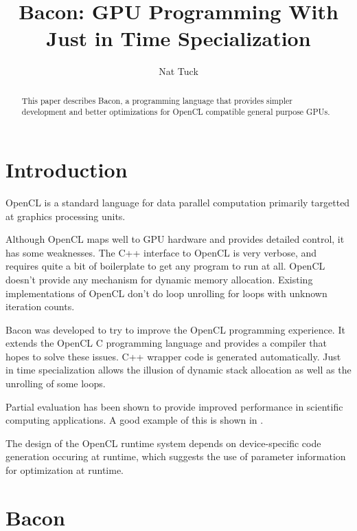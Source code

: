 \documentclass{llncs}
\begin{document}
\title{Bacon: GPU Programming With Just in Time Specialization}

\author{Nat Tuck}


\maketitle

\begin{abstract}

This paper describes Bacon, a programming language that provides
simpler development and better optimizations for OpenCL compatible
general purpose GPUs.

\end{abstract}

\section{Introduction}

OpenCL is a standard language for data parallel computation primarily
targetted at graphics processing units.

Although OpenCL maps well to GPU hardware and provides detailed
control, it has some weaknesses. The C++ interface to OpenCL is very
verbose, and requires quite a bit of boilerplate to get any program to
run at all. OpenCL doesn't provide any mechanism for dynamic memory
allocation. Existing implementations of OpenCL don't do loop unrolling
for loops with unknown iteration counts.

Bacon was developed to try to improve the OpenCL programming
experience. It extends the OpenCL C programming language and provides
a compiler that hopes to solve these issues. C++ wrapper code is
generated automatically. Just in time specialization allows the 
illusion of dynamic stack allocation as well as the unrolling of
some loops.

Partial evaluation has been shown to provide improved performance in
scientific computing applications. A good example of this is shown in
\cite{Berlin:1990}.

The design of the OpenCL runtime system depends on device-specific
code generation occuring at runtime, which suggests the use of
parameter information for optimization at runtime.

\section{Bacon}
\end{document}
